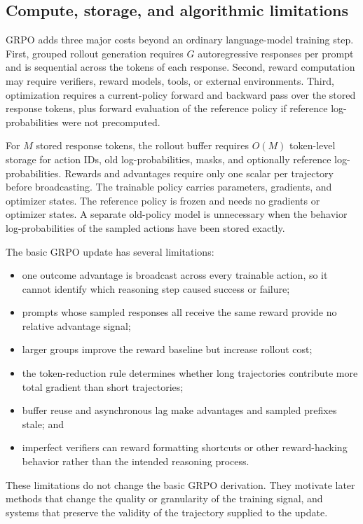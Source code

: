 \subsection{Compute, storage, and algorithmic limitations}

GRPO adds three major costs beyond an ordinary language-model training step. First,
grouped rollout generation requires $G$ autoregressive responses per prompt and is
sequential across the tokens of each response. Second, reward computation may require
verifiers, reward models, tools, or external environments. Third, optimization requires a
current-policy forward and backward pass over the stored response tokens, plus forward
evaluation of the reference policy if reference log-probabilities were not precomputed.

For $M$ stored response tokens, the rollout buffer requires $O(M)$ token-level storage for
action IDs, old log-probabilities, masks, and optionally reference log-probabilities. Rewards
and advantages require only one scalar per trajectory before broadcasting. The trainable
policy carries parameters, gradients, and optimizer states. The reference policy is frozen
and needs no gradients or optimizer states. A separate old-policy model is unnecessary
when the behavior log-probabilities of the sampled actions have been stored exactly.

The basic GRPO update has several limitations:
\begin{itemize}
  \item one outcome advantage is broadcast across every trainable action, so it cannot
        identify which reasoning step caused success or failure;
  \item prompts whose sampled responses all receive the same reward provide no relative
        advantage signal;
  \item larger groups improve the reward baseline but increase rollout cost;
  \item the token-reduction rule determines whether long trajectories contribute more
        total gradient than short trajectories;
  \item buffer reuse and asynchronous lag make advantages and sampled prefixes stale; and
  \item imperfect verifiers can reward formatting shortcuts or other reward-hacking
        behavior rather than the intended reasoning process.
\end{itemize}

These limitations do not change the basic GRPO derivation. They motivate later methods
that change the quality or granularity of the training signal, and systems that preserve
the validity of the trajectory supplied to the update.
